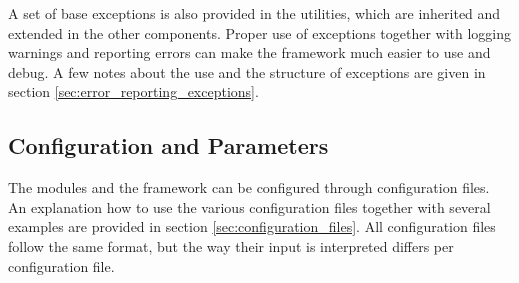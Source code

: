 A set of base exceptions is also provided in the utilities, which are inherited and extended in the other components. Proper use of exceptions together with logging warnings and reporting errors can make the framework much easier to use and debug. A few notes about the use and the structure of exceptions are given in section \ref{sec:error_reporting_exceptions}.

\subsection{Configuration and Parameters}
\label{sec:config_parameters}
The modules and the framework can be configured through configuration files. An explanation how to use the various configuration files together with several examples are provided in section \ref{sec:configuration_files}. All configuration files follow the same format, but the way their input is interpreted differs per configuration file.

